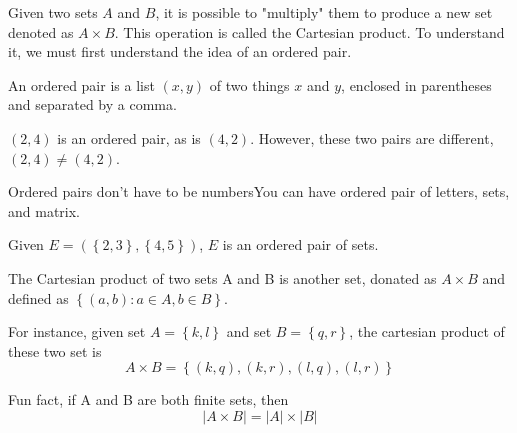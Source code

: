 Given two sets $A$ and $B$, it is possible to "multiply" them to produce a new set denoted as $A \times B$. 
This operation is called the Cartesian product. To understand it, we must first understand the idea of an ordered pair. 
\begin{definition}
     An ordered pair is a list $\left(x, y\right)$ of two things $x$ and $y$, enclosed in parentheses and separated by a comma. 
\end{definition}
\begin{example}
    $(2, 4)$ is an ordered pair, as is $(4, 2)$. However, these two pairs are different, $(2, 4) \neq (4, 2)$.
\end{example}
Ordered pairs don't have to be numbersYou can have ordered pair of letters, sets, and matrix. 
\begin{example}
    Given $E = \left( \left\{2, 3\right\}, \left\{4, 5\right\}\right)$, $E$ is an ordered pair of sets. 
\end{example}

\begin{definition}
     The Cartesian product of two sets A and B is another set, donated as $A \times B$ and defined as $\left\{\left(a, b\right) :
    a \in A, b \in B\right\}$.
\end{definition}
For instance, given set $A = \left\{k, l\right\}$ and set $B = \left\{q, r\right\}$, the cartesian product of these two set is
$$A \times B = \left\{(k, q), (k, r), (l, q), (l, r)\right\}$$

Fun fact, if A and B are both finite sets, then 
\begin{equation*}
    \left|A \times B\right| = \left|A\right| \times \left|B\right|
\end{equation*}